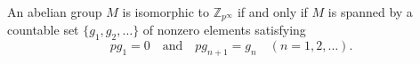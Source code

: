 An abelian group $M$ is isomorphic to $\mathbb{Z}_{p^\infty}$ if and only if $M$ is spanned by a countable set $\{g_1, g_2, \ldots\}$ of nonzero elements satisfying
$$p g_1 = 0 \quad \text{and} \quad p g_{n+1} = g_n \quad (n = 1, 2, \ldots).$$
